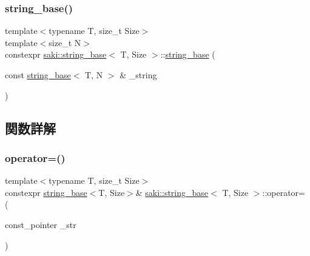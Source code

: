 \subsubsection{\texorpdfstring{string\+\_\+base()}{string\_base()}\hspace{0.1cm}{\footnotesize\ttfamily [3/3]}}
{\footnotesize\ttfamily template$<$typename T, size\+\_\+t Size$>$ \\
template$<$size\+\_\+t N$>$ \\
constexpr \mbox{\hyperlink{classsaki_1_1string__base}{saki\+::string\+\_\+base}}$<$ T, Size $>$\+::\mbox{\hyperlink{classsaki_1_1string__base}{string\+\_\+base}} (\begin{DoxyParamCaption}\item[{const \mbox{\hyperlink{classsaki_1_1string__base}{string\+\_\+base}}$<$ T, N $>$ \&}]{\+\_\+string }\end{DoxyParamCaption})\hspace{0.3cm}{\ttfamily [inline]}}



\subsection{関数詳解}
\mbox{\label{classsaki_1_1string__base_ad6f67113019884abb525aa75f6c7d1a9}} 
\subsubsection{\texorpdfstring{operator=()}{operator=()}\hspace{0.1cm}{\footnotesize\ttfamily [1/2]}}
{\footnotesize\ttfamily template$<$typename T, size\+\_\+t Size$>$ \\
constexpr \mbox{\hyperlink{classsaki_1_1string__base}{string\+\_\+base}}$<$T, Size$>$\& \mbox{\hyperlink{classsaki_1_1string__base}{saki\+::string\+\_\+base}}$<$ T, Size $>$\+::operator= (\begin{DoxyParamCaption}\item[{const\+\_\+pointer}]{\+\_\+str }\end{DoxyParamCaption})\hspace{0.3cm}{\ttfamily [inline]}}

\mbox{\label{classsaki_1_1string__base_a44b85c70f7ed89e2e382861f3323f4d5}} 
